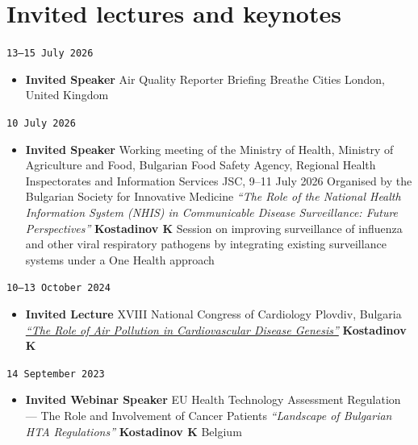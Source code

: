 \documentclass[
  10.5pt,
  a4paper,
  DIV=11,
  numbers=noendperiod]{scrartcl}
\providecommand{\tightlist}{%
  \setlength{\itemsep}{0pt}\setlength{\parskip}{0pt}}
\let\oldtexttt\texttt
\renewcommand{\texttt}[1]{{\color{cvbronze}\small\oldtexttt{#1}}}
\begin{document}
\section{Invited lectures and
keynotes}\label{invited-lectures-and-keynotes}

\texttt{13–15\ July\ 2026}

\begin{itemize}
\tightlist
\item
  \textbf{Invited Speaker} \textbar{} Air Quality Reporter Briefing
  \textbar{} Breathe Cities \textbar{} London, United Kingdom
\end{itemize}

\texttt{10\ July\ 2026}

\begin{itemize}
\tightlist
\item
  \textbf{Invited Speaker} \textbar{} Working meeting of the Ministry of
  Health, Ministry of Agriculture and Food, Bulgarian Food Safety
  Agency, Regional Health Inspectorates and Information Services JSC,
  9--11 July 2026 \textbar{} Organised by the Bulgarian Society for
  Innovative Medicine \textbar{} \emph{``The Role of the National Health
  Information System (NHIS) in Communicable Disease Surveillance: Future
  Perspectives''} \textbar{} \textbf{Kostadinov K} \textbar{} Session on
  improving surveillance of influenza and other viral respiratory
  pathogens by integrating existing surveillance systems under a One
  Health approach
\end{itemize}

\texttt{10–13\ October\ 2024}

\begin{itemize}
\tightlist
\item
  \textbf{Invited Lecture} \textbar{} XVIII National Congress of
  Cardiology \textbar{} Plovdiv, Bulgaria \textbar{}
  \emph{\href{https://www.bgcardio.org/storage/app/media/uploaded-files/XVIII\%20Congress\%20program_web.pdf}{``The
  Role of Air Pollution in Cardiovascular Disease Genesis''}} \textbar{}
  \textbf{Kostadinov K}
\end{itemize}

\texttt{14\ September\ 2023}

\begin{itemize}
\tightlist
\item
  \textbf{Invited Webinar Speaker} \textbar{} EU Health Technology
  Assessment Regulation --- The Role and Involvement of Cancer Patients
  \textbar{} \emph{``Landscape of Bulgarian HTA Regulations''}
  \textbar{} \textbf{Kostadinov K} \textbar{} Belgium
\end{itemize}
\end{document}
